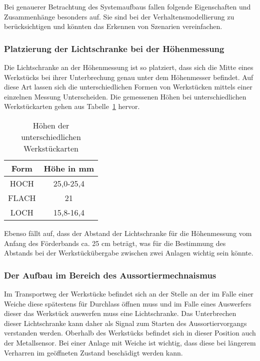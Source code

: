 Bei genauerer Betrachtung des Systemaufbaus fallen folgende Eigenschaften und Zusammenhänge besonders auf.
Sie sind bei der Verhaltensmodellierung zu berücksichtigen und könnten das Erkennen von Szenarien vereinfachen.

\subsubsection{Platzierung der Lichtschranke bei der Höhenmessung}

Die Lichtschranke an der Höhenmessung ist so platziert, dass sich die Mitte eines Werkstücks bei ihrer Unterbrechung genau unter dem Höhenmesser befindet.
Auf diese Art lassen sich die unterschiedlichen Formen von Werkstücken mittels einer einzelnen Messung Unterscheiden.
Die gemessenen Höhen bei unterschiedlichen Werkstückarten gehen aus Tabelle~\ref{tab:werkstuecke} hervor.

\begin{table}[h]
    \begin{center}
        \begin{tabular}{ |c|c| }
            \hline
            Form                     & Höhe in mm \\
            \hline\hline
            HOCH                 &  25,0-25,4\\
            \hline
            FLACH                     & 21 \\
            \hline
            LOCH               & 15,8-16,4 \\
            \hline
        \end{tabular}
    \end{center}
    \caption{Höhen der unterschiedlichen Werkstückarten}
    \label{tab:werkstuecke}
\end{table}

Ebenso fällt auf, dass der Abstand der Lichtschranke für die Höhenmessung vom Anfang des Förderbands ca. 25 cm beträgt, was für die Bestimmung des Abstands bei der Werkstückübergabe zwischen zwei Anlagen wichtig sein könnte.

\subsubsection{Der Aufbau im Bereich des Aussortiermechnaismus}

Im Transportweg der Werkstücke befindet sich an der Stelle an der im Falle einer Weiche diese spätestens für Durchlass öffnen muss und im Falle eines Auswerfers dieser das Werkstück auswerfen muss eine Lichtschranke.
Das Unterbrechen dieser Lichtschranke kann daher als Signal zum Starten des Aussortiervorgangs verstanden werden.
Oberhalb des Werkstücks befindet sich in dieser Position auch der Metallsensor.
Bei einer Anlage mit Weiche ist wichtig, dass diese bei längerem Verharren im geöffneten Zustand beschädigt werden kann.

